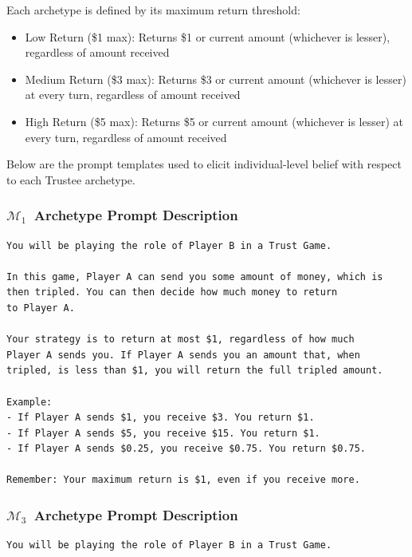 \documentclass{article} %
\newcommand{\maxoneusd}{$\mathcal{M}_1$\ }
\newcommand{\maxthreeusd}{$\mathcal{M}_3$\ }
\begin{document}
\begin{appendices}
Each archetype is defined by its maximum return threshold:
\begin{itemize}
    \item Low Return (\$1 max): Returns \$1 or current amount (whichever is lesser), regardless of amount received
    \item Medium Return (\$3 max): Returns \$3 or current amount (whichever is lesser) at every turn, regardless of amount received
    \item High Return (\$5 max): Returns \$5 or current amount (whichever is lesser) at every turn, regardless of amount received
\end{itemize}

Below are the prompt templates used to elicit individual-level belief with respect to each Trustee archetype.

\subsubsection{\maxoneusd Archetype Prompt Description}
\begin{lstlisting}[frame=single,basicstyle=\ttfamily\small,showspaces=false]
You will be playing the role of Player B in a Trust Game.

In this game, Player A can send you some amount of money, which is
then tripled. You can then decide how much money to return
to Player A.

Your strategy is to return at most $1, regardless of how much
Player A sends you. If Player A sends you an amount that, when
tripled, is less than $1, you will return the full tripled amount.

Example:
- If Player A sends $1, you receive $3. You return $1.
- If Player A sends $5, you receive $15. You return $1.
- If Player A sends $0.25, you receive $0.75. You return $0.75.

Remember: Your maximum return is $1, even if you receive more.
\end{lstlisting}

\subsubsection{\maxthreeusd Archetype Prompt Description}
\begin{lstlisting}[frame=single,basicstyle=\ttfamily\small,showspaces=false]
You will be playing the role of Player B in a Trust Game.


\end{lstlisting}
\end{appendices}
\end{document}
